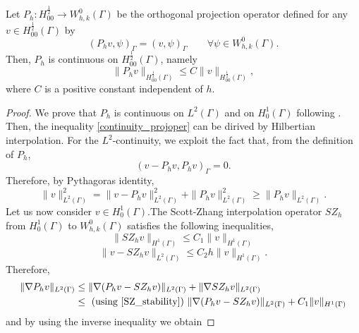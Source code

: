 \begin{lemma}
Let $P_h: H^{\frac 12}_{00} \longrightarrow W_{h,k}^0(\Gamma)$ be the orthogonal projection operator defined  for any $v \in H^{\frac 12}_{00}(\Gamma)$ by
\begin{equation*}
(P_h v , \psi)_\Gamma= (v, \psi)_\Gamma \qquad \forall \psi \in W_{h,k}^0(\Gamma).  
\end{equation*} 
Then, $P_h$ is continuous on $H^{\frac 12}_{00}(\Gamma)$, namely
\begin{equation}\label{continuity_projoper}
\|P_h v\|_{H^{\frac 12}_{00}(\Gamma)} \leq C \|v\|_{H^{\frac 12}_{00}(\Gamma)},
\end{equation}
where $C$ is a positive constant independent of $h$.
\end{lemma}
\begin{proof}
We prove that $P_h$ is continuous on $L^2(\Gamma)$ and on $H^1_0(\Gamma)$ following \cite[Section 1.6.3]{MR2050138}.  Then, the inequality \eqref{continuity_projoper} can be dirived by Hilbertian interpolation. For the $L^2$-continuity, we exploit the fact that, from the definition of $P_h$,
\begin{equation*}
(v-P_h v,P_h v)_{\Gamma}=0.
\end{equation*} 
Therefore, by Pythagoras identity,
\begin{equation*}
\|v\|^2_{L^2(\Gamma)} = \|v-P_h v\|_{L^2(\Gamma)}^2 + \|P_h v\|_{L^2(\Gamma)}^2 \geq \|P_h v\| _{L^2(\Gamma)}.
\end{equation*}
Let us now consider $v\in H^1_0(\Gamma)$.The Scott-Zhang interpolation operator $SZ_h$ from $H^1_0(\Gamma)$ to $W_{h,k}^0(\Gamma)$ satisfies the following inequalities,
\begin{equation}\label{SZ_stability}
\|SZ_h v\|_{H^1(\Gamma)} \leq C_1 \|v\|_{H^1(\Gamma)}
\end{equation} 
\begin{equation}\label{SZ_approx}
\|v -SZ_h v \|_{L^2(\Gamma)}\leq C_2 h \|v\|_{H^1(\Gamma)}.
\end{equation}
Therefore,
\begin{equation*}
\begin{split}
\|\nabla P_h v\|_{L^2(\Gamma)} 
&\leq \|\nabla (P_h v - SZ_h v)\|_{L^2(\Gamma)} + \|\nabla SZ_h v\|_{L^2(\Gamma)}\\
&\leq \text{ (using \eqref{SZ_stability}) } \|\nabla (P_h v - SZ_h v)\|_{L^2(\Gamma)} + C_1\|v\|_{H^1(\Gamma)}
\end{split}
\end{equation*}
and by using the inverse inequality we obtain

\end{proof}
